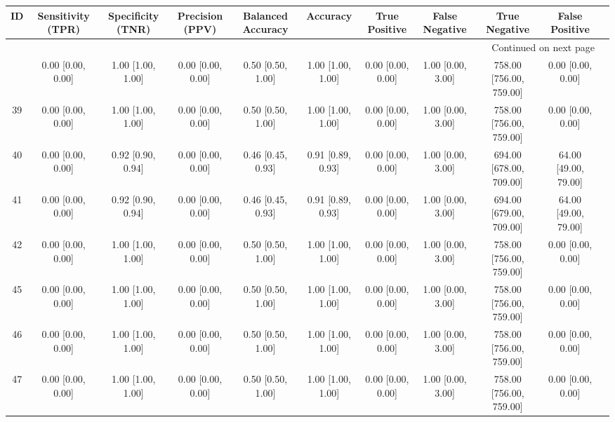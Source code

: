 \documentclass[8pt]{article}
\begin{document}
\begin{center}
\begin{footnotesize}
\begin{longtable}{|ccccccccccc|}
\toprule
 ID &  Sensitivity (TPR) &  Specificity (TNR) &    Precision (PPV) &  Balanced Accuracy &           Accuracy &      True Positive &     False Negative &            True Negative &        False Positive \\
\midrule
\endhead
\midrule
\multicolumn{10}{r}{{Continued on next page}} \\
\midrule
\endfoot

\bottomrule
\endlastfoot
 36 &  0.00 [0.00, 0.00] &  1.00 [1.00, 1.00] &  0.00 [0.00, 0.00] &  0.50 [0.50, 1.00] &  1.00 [1.00, 1.00] &  0.00 [0.00, 0.00] &  1.00 [0.00, 3.00] &  758.00 [756.00, 759.00] &     0.00 [0.00, 0.00] \\
 39 &  0.00 [0.00, 0.00] &  1.00 [1.00, 1.00] &  0.00 [0.00, 0.00] &  0.50 [0.50, 1.00] &  1.00 [1.00, 1.00] &  0.00 [0.00, 0.00] &  1.00 [0.00, 3.00] &  758.00 [756.00, 759.00] &     0.00 [0.00, 0.00] \\
 40 &  0.00 [0.00, 0.00] &  0.92 [0.90, 0.94] &  0.00 [0.00, 0.00] &  0.46 [0.45, 0.93] &  0.91 [0.89, 0.93] &  0.00 [0.00, 0.00] &  1.00 [0.00, 3.00] &  694.00 [678.00, 709.00] &  64.00 [49.00, 79.00] \\
 41 &  0.00 [0.00, 0.00] &  0.92 [0.90, 0.94] &  0.00 [0.00, 0.00] &  0.46 [0.45, 0.93] &  0.91 [0.89, 0.93] &  0.00 [0.00, 0.00] &  1.00 [0.00, 3.00] &  694.00 [679.00, 709.00] &  64.00 [49.00, 79.00] \\
 42 &  0.00 [0.00, 0.00] &  1.00 [1.00, 1.00] &  0.00 [0.00, 0.00] &  0.50 [0.50, 1.00] &  1.00 [1.00, 1.00] &  0.00 [0.00, 0.00] &  1.00 [0.00, 3.00] &  758.00 [756.00, 759.00] &     0.00 [0.00, 0.00] \\
 45 &  0.00 [0.00, 0.00] &  1.00 [1.00, 1.00] &  0.00 [0.00, 0.00] &  0.50 [0.50, 1.00] &  1.00 [1.00, 1.00] &  0.00 [0.00, 0.00] &  1.00 [0.00, 3.00] &  758.00 [756.00, 759.00] &     0.00 [0.00, 0.00] \\
 46 &  0.00 [0.00, 0.00] &  1.00 [1.00, 1.00] &  0.00 [0.00, 0.00] &  0.50 [0.50, 1.00] &  1.00 [1.00, 1.00] &  0.00 [0.00, 0.00] &  1.00 [0.00, 3.00] &  758.00 [756.00, 759.00] &     0.00 [0.00, 0.00] \\
 47 &  0.00 [0.00, 0.00] &  1.00 [1.00, 1.00] &  0.00 [0.00, 0.00] &  0.50 [0.50, 1.00] &  1.00 [1.00, 1.00] &  0.00 [0.00, 0.00] &  1.00 [0.00, 3.00] &  758.00 [756.00, 759.00] &     0.00 [0.00, 0.00] \\

\end{longtable}
\end{footnotesize}
\end{center}
\end{document}
